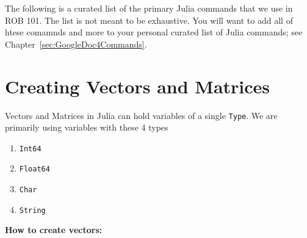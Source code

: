 
The following is a curated list of the primary Julia commands that we use in ROB 101. The list is not meant to be exhaustive. You will want to add all of htese comamnds and more to your personal curated list of Julia commands; see Chapter~\ref{sec:GoogleDoc4Commands}.

\section{Creating Vectors and Matrices}
\label{sec:AppendixA:CreateVectorsMatrices}

Vectors and Matrices in Julia can hold variables of a single \texttt{Type}. We are primarily using
variables with these 4 types
\begin{enumerate}
        \renewcommand{\labelenumi}{(\alph{enumi})}
        \setlength{\itemsep}{.1cm}
    \item \texttt{Int64}
    \item \texttt{Float64}
    \item \texttt{Char}
    \item \texttt{String}
\end{enumerate}

\textbf{How to create vectors:}

